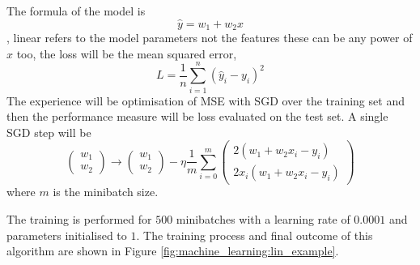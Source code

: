 The formula of the model is
\begin{equation}
    \hat{y} = w_{1} + w_{2}x
\end{equation},
linear refers to the model parameters not the features these can be any power of $x$ too, 
the loss will be the mean squared error,
\begin{equation}
    L = \frac{1}{n}\sum_{i=1}^{n}(\hat{y}_{i}-y_{i})^{2}
\end{equation}
The experience will be optimisation of MSE with SGD over the training set and then the performance measure will be loss evaluated on the test set. 
A single SGD step will be 
\begin{equation}
    \begin{pmatrix}
        w_{1} \\
        w_{2}
    \end{pmatrix} \rightarrow
    \begin{pmatrix}
        w_{1} \\
        w_{2}
    \end{pmatrix} - \eta
    \frac{1}{m}\sum_{i=0}^{m}
    \begin{pmatrix}
        2(w_{1}+w_{2}x_{i} - y_{i})\\
        2x_{i}(w_{1}+w_{2}x_{i} - y_{i})
    \end{pmatrix}
\end{equation}
where $m$ is the minibatch size.

The training is performed for $500$ minibatches with a learning rate of $0.0001$ and parameters initialised to $1$. The training process and final outcome of this algorithm are shown in Figure \ref{fig:machine_learning:lin_example}.

